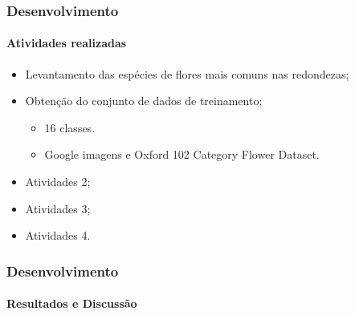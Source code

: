 \documentclass{beamer}
\begin{document}
    
    \begin{frame}
      \frametitle{Desenvolvimento}
      \framesubtitle{Atividades realizadas}
      
      \begin{itemize}
        \item<1-> Levantamento das espécies de flores mais comuns nas redondezas;\medskip
	    \item<2-> Obtenção do conjunto de dados de treinamento;
	    		\begin{itemize}
	    			\item 16 classes.
	    			\item Google imagens e Oxford 102 Category Flower Dataset.
	    		\end{itemize}
        \item<3-> Atividades 2; \medskip
        \item<4-> Atividades 3; \medskip
        \item<5-> Atividades 4.
      \end{itemize}
    \end{frame}
    
    
    \begin{frame}
      \frametitle{Desenvolvimento}
      \framesubtitle{Resultados e Discussão}
      
    
    
    
    \end{frame}
    
\end{document}
